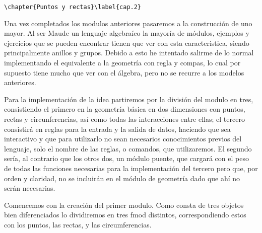 
\begin{verbatim}
\chapter{Puntos y rectas}\label{cap.2}
\end{verbatim}

Una vez completados los modulos anteriores pasaremos a la construcción de uno mayor. Al ser Maude un lenguaje algebraíco la mayoría de módulos, ejemplos y ejercicios que se pueden encontrar tienen que ver con esta caracteristica, siendo principalmente anillos y grupos. Debido a esto he intentado salirme de lo normal implementando el equivalente a la geometría con regla y compas, lo cual por supuesto tiene mucho que ver con el álgebra, pero no se recurre a los modelos anteriores. \par

Para la implementaci\'on de la idea partiremos por la división del modulo en tres, consistiendo el primero en la geometría básica en dos dimensiones con puntos, rectas y circunferencias, así como todas las interacciones entre ellas; el tercero consistirá en reglas para la entrada y la salida de datos, haciendo que sea interactivo y que para utilizarlo no sean necesarios conocimientos previos del lenguaje, solo el nombre de las reglas, o comandos, que utilizaremos. El segundo sería, al contrario que los otros dos, un módulo puente, que cargará con el peso de todas las funciones necesarias para la implementación del tercero pero que, por orden y claridad, no se incluirán en el módulo de geometría dado que ahí no serán necesarias. \par

Comencemos con la creación del primer modulo.  Como consta de tres objetos bien diferenciados lo dividiremos en tres fmod distintos, correspondiendo estos con los puntos, las rectas, y las circumferencias. \par

